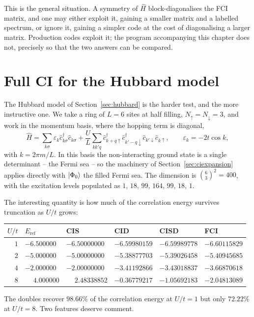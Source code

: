 This is the general situation.  A symmetry of $\hat{H}$ block-diagonalises the
FCI matrix, and one may either exploit it, gaining a smaller matrix and a
labelled spectrum, or ignore it, gaining a simpler code at the cost of
diagonalising a larger matrix.  Production codes exploit it; the program
accompanying this chapter does not, precisely so that the two answers can be
compared.

\section{Full CI for the Hubbard model}
\label{sec:fcihubbard}

The Hubbard model of Section~\ref{sec:hubbard} is the harder test, and the
more instructive one.  We take a ring of $L=6$ sites at half filling,
$N_{\uparrow}=N_{\downarrow}=3$, and work in the momentum basis, where the
hopping term is diagonal,
\begin{equation}
  \hat{H} = \sum_{k\sigma}\varepsilon_k
    \hat{c}^{\dagger}_{k\sigma}\hat{c}_{k\sigma}
  + \frac{U}{L}\sum_{kk'q}
    \hat{c}^{\dagger}_{k+q\uparrow}\hat{c}^{\dagger}_{k'-q\downarrow}
    \hat{c}_{k'\downarrow}\hat{c}_{k\uparrow},
  \qquad
  \varepsilon_k = -2t\cos k,
  \label{eq:5-hubbardmom}
\end{equation}
with $k=2\pi m/L$.  In this basis the non-interacting ground state is a single
determinant -- the Fermi sea -- so the machinery of
Section~\ref{sec:ciexpansion} applies directly with $\vert \Phi_0 \rangle$ the filled
Fermi sea.  The dimension is $\binom{6}{3}^2=400$, with the excitation levels
populated as $1$, $18$, $99$, $164$, $99$, $18$, $1$.

The interesting quantity is how much of the correlation energy survives
truncation as $U/t$ grows:
\begin{center}
\renewcommand{\arraystretch}{1.2}
\begin{tabular}{rlllll}
\toprule
$U/t$ & $E_{\mathrm{ref}}$ & CIS & CID & CISD & FCI\\
\midrule
$1$ & $-6.500000$ & $-6.50000000$ & $-6.59980159$ & $-6.59989778$ & $-6.60115829$\\
$2$ & $-5.000000$ & $-5.00000000$ & $-5.38877703$ & $-5.39026458$ & $-5.40945685$\\
$4$ & $-2.000000$ & $-2.00000000$ & $-3.41192866$ & $-3.43018837$ & $-3.66870618$\\
$8$ & $\phantom{-}4.000000$ & $\phantom{-}2.48338852$ & $-0.36779217$ & $-1.05692183$ & $-2.04813089$\\
\bottomrule
\end{tabular}
\end{center}
The doubles recover $98.66\%$ of the correlation energy at $U/t=1$ but only
$72.22\%$ at $U/t=8$.  Two features deserve comment.

